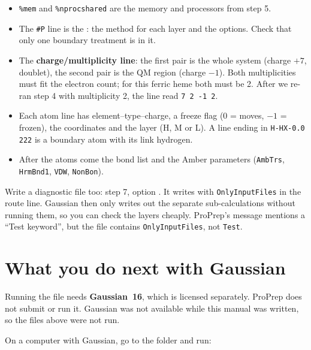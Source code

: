 \begin{itemize}
  \item \texttt{\%mem} and \texttt{\%nprocshared} are the memory and
        processors from step 5.
  \item The \texttt{\#P} line is the : the method for each
        layer and the options. Check that only one boundary treatment is in
        it.
  \item The \textbf{charge/multiplicity line}: the first pair is the whole
        system (charge $+7$, doublet), the second pair is the QM region
        (charge $-1$). Both multiplicities must fit the electron count; for
        this ferric heme both must be 2. After we re-ran step 4 with
        multiplicity 2, the line read \texttt{7 2 -1 2}.
  \item Each atom line has element--type--charge, a freeze flag (0 = moves,
        $-1$ = frozen), the coordinates and the layer (H, M or L). A line
        ending in \texttt{H-HX-0.0 222} is a boundary atom with its link
        hydrogen.
  \item After the atoms come the bond list and the Amber parameters
        (\texttt{AmbTrs}, \texttt{HrmBnd1}, \texttt{VDW}, \texttt{NonBon}).
\end{itemize}

\begin{tip}
Write a diagnostic file too: step 7, option . It writes
 with \texttt{OnlyInputFiles} in the route line.
Gaussian then only writes out the separate sub-calculations without running
them, so you can check the layers cheaply. ProPrep's message mentions a
``Test keyword'', but the file contains \texttt{OnlyInputFiles}, not
\texttt{Test}.
\end{tip}

\section{What you do next with Gaussian}
\label{sec:qmmm-gaussian}

\begin{needsoftware}
Running the  file needs \textbf{Gaussian~16}, which is licensed
separately. ProPrep does not submit or run it. Gaussian was not available
while this manual was written, so the files above were not run.
\end{needsoftware}

On a computer with Gaussian, go to the  folder and run:

